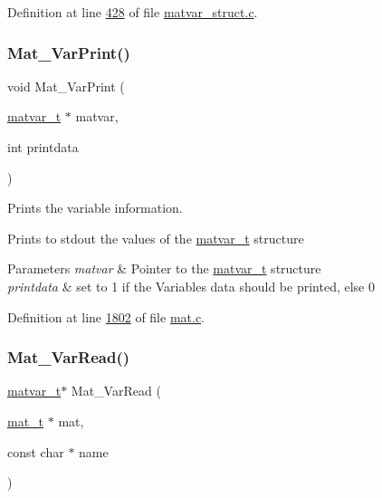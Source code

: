 Definition at line \hyperlink{matvar__struct_8c_source_l00428}{428} of file \hyperlink{matvar__struct_8c_source}{matvar\+\_\+struct.\+c}.

\mbox{\label{group___m_a_t_ga9100c145e338b84b55d5d0795d5d390a}} 
\subsubsection{\texorpdfstring{Mat\+\_\+\+Var\+Print()}{Mat\_VarPrint()}}
{\footnotesize\ttfamily void Mat\+\_\+\+Var\+Print (\begin{DoxyParamCaption}\item[{\hyperlink{group___m_a_t_structmatvar__t}{matvar\+\_\+t} $\ast$}]{matvar,  }\item[{int}]{printdata }\end{DoxyParamCaption})}



Prints the variable information. 

Prints to stdout the values of the \hyperlink{group___m_a_t_structmatvar__t}{matvar\+\_\+t} structure


\begin{DoxyParams}{Parameters}
{\em matvar} & Pointer to the \hyperlink{group___m_a_t_structmatvar__t}{matvar\+\_\+t} structure \\
\hline
{\em printdata} & set to 1 if the Variables data should be printed, else 0 \\
\hline
\end{DoxyParams}


Definition at line \hyperlink{mat_8c_source_l01802}{1802} of file \hyperlink{mat_8c_source}{mat.\+c}.

\mbox{\label{group___m_a_t_ga3505f63029763eaa73d5a19f1115eb42}} 
\subsubsection{\texorpdfstring{Mat\+\_\+\+Var\+Read()}{Mat\_VarRead()}}
{\footnotesize\ttfamily \hyperlink{group___m_a_t_structmatvar__t}{matvar\+\_\+t}$\ast$ Mat\+\_\+\+Var\+Read (\begin{DoxyParamCaption}\item[{\hyperlink{group___m_a_t_gab0fc888f5a5d79943b16284b1f91c2e8}{mat\+\_\+t} $\ast$}]{mat,  }\item[{const char $\ast$}]{name }\end{DoxyParamCaption})}



